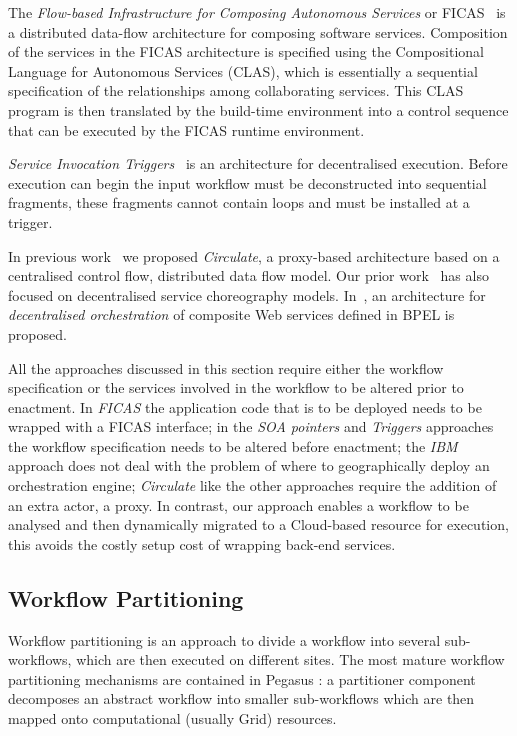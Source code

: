 \documentclass[10pt, conference, compsocconf]{IEEEtran}
\begin{document}
The \emph{Flow-based Infrastructure for Composing Autonomous Services} or FICAS~\cite{liu-data-flow} is a distributed data-flow architecture for composing software services.  Composition of the services in the FICAS architecture is specified using the Compositional Language for Autonomous Services (CLAS), which is essentially a sequential specification of the relationships among collaborating services. This CLAS program is then translated by the build-time environment into a control sequence that can be executed by the FICAS runtime environment.

\emph{Service Invocation Triggers}~\cite{binder} is an architecture for decentralised execution. Before execution can begin the input workflow must be deconstructed into sequential fragments, these fragments cannot contain loops and must be installed at a trigger.



In previous work~\cite{ccgrid08} \cite{hpdc08} we proposed \emph{Circulate}, a proxy-based architecture based on a centralised control flow, distributed data flow model. Our prior work~\cite{cite2} has also focused on decentralised service choreography models. In~\cite{IBM_decentral}, an architecture for \emph{decentralised orchestration} of composite Web services defined in BPEL is proposed.


All the approaches discussed in this section require either the workflow specification or the services involved in the workflow to be altered prior to enactment. In \emph{FICAS} the application code that is to be deployed needs to be wrapped with a FICAS interface; in the \emph{SOA pointers} and \emph{Triggers} approaches the workflow specification needs to be altered before enactment; the \emph{IBM} approach does not deal with the problem of where to geographically deploy an orchestration engine;  \emph{Circulate} like the other approaches require the addition of an extra actor, a proxy.  In contrast, our approach enables a workflow to be analysed and then dynamically migrated to a Cloud-based resource for execution, this avoids the costly setup cost of wrapping back-end services.






\subsection{Workflow Partitioning}

Workflow partitioning is an approach to divide a workflow into several sub-workflows, which are then executed on different sites. The most mature workflow partitioning mechanisms are contained in Pegasus \cite{paritioning}: a partitioner component decomposes an abstract workflow into smaller sub-workflows which are then mapped onto computational (usually Grid) resources.
\end{document}
